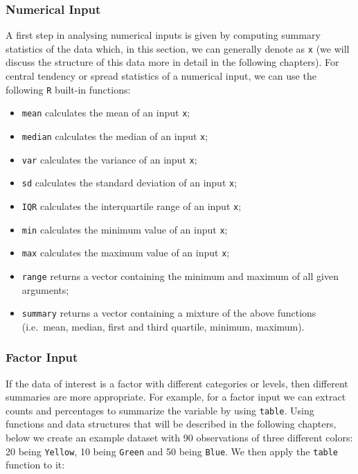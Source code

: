 \documentclass[]{book}
\providecommand{\tightlist}{%
  \setlength{\itemsep}{0pt}\setlength{\parskip}{0pt}}
\theoremstyle{definition}
\theoremstyle{definition}
\theoremstyle{remark}
\begin{document}
\subsubsection{Numerical Input}\label{numerical-input}

A first step in analysing numerical inputs is given by computing summary
statistics of the data which, in this section, we can generally denote
as \texttt{x} (we will discuss the structure of this data more in detail
in the following chapters). For central tendency or spread statistics of
a numerical input, we can use the following \texttt{R} built-in
functions:

\begin{itemize}
\tightlist
\item
  \texttt{mean} calculates the mean of an input \texttt{x};
\item
  \texttt{median} calculates the median of an input \texttt{x};
\item
  \texttt{var} calculates the variance of an input \texttt{x};
\item
  \texttt{sd} calculates the standard deviation of an input \texttt{x};
\item
  \texttt{IQR} calculates the interquartile range of an input
  \texttt{x};
\item
  \texttt{min} calculates the minimum value of an input \texttt{x};
\item
  \texttt{max} calculates the maximum value of an input \texttt{x};
\item
  \texttt{range} returns a vector containing the minimum and maximum of
  all given arguments;
\item
  \texttt{summary} returns a vector containing a mixture of the above
  functions (i.e.~mean, median, first and third quartile, minimum,
  maximum).
\end{itemize}

\subsubsection{Factor Input}\label{factor-input}

If the data of interest is a factor with different categories or levels,
then different summaries are more appropriate. For example, for a factor
input we can extract counts and percentages to summarize the variable by
using \texttt{table}. Using functions and data structures that will be
described in the following chapters, below we create an example dataset
with 90 observations of three different colors: 20 being
\texttt{Yellow}, 10 being \texttt{Green} and 50 being \texttt{Blue}. We
then apply the \texttt{table} function to it:
\end{document}
